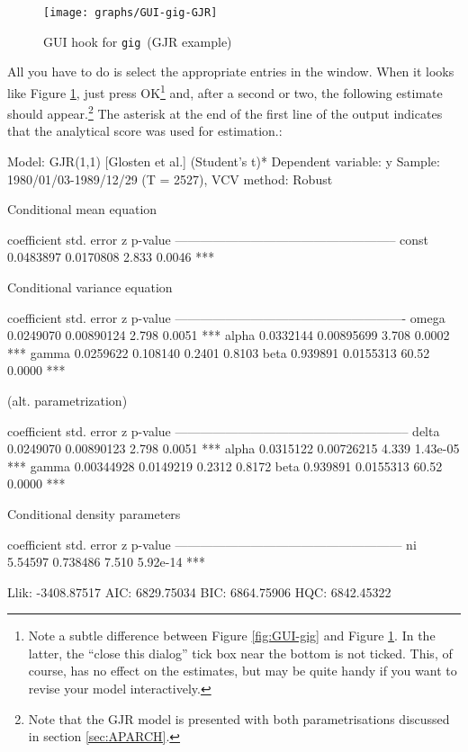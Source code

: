 \documentclass[a4paper,11pt]{article}
\newcommand{\dtk}[1]{\texttt{\detokenize{#1}}}
\newcommand{\gig}{\texttt{gig}}
\begin{document}
\begin{figure}[htb]
  \centering
  \texttt{[image: graphs/GUI-gig-GJR]}
  \caption{GUI hook for \gig\ (GJR example)}
  \label{fig:GUI-gig-GJR}
\end{figure}

All you have to do is select the appropriate entries in the
\dtk{GUI_gig} window. When it looks like Figure
\ref{fig:GUI-gig-GJR}, just press OK\footnote{Note a subtle difference
  between Figure \ref{fig:GUI-gig} and Figure
  \ref{fig:GUI-gig-GJR}. In the latter, the ``close this dialog'' tick
  box near the bottom is not ticked. This, of course, has no effect on
  the estimates, but may be quite handy if you want to revise your
  model interactively.} and, after a second or two, the following
estimate should appear.\footnote{Note that the GJR model is presented
  with both parametrisations discussed in section
  \ref{sec:APARCH}.} The asterisk at the end of the first line of the
output indicates that the analytical score was used for estimation.:

\begin{code}
Model: GJR(1,1) [Glosten et al.] (Student's t)*
Dependent variable: y
Sample: 1980/01/03-1989/12/29 (T = 2527), VCV method: Robust

    Conditional mean equation

             coefficient   std. error     z     p-value
  -----------------------------------------------------
  const       0.0483897    0.0170808    2.833   0.0046  ***

    Conditional variance equation

             coefficient   std. error      z      p-value
  -------------------------------------------------------
  omega       0.0249070    0.00890124    2.798    0.0051  ***
  alpha       0.0332144    0.00895699    3.708    0.0002  ***
  gamma       0.0259622    0.108140      0.2401   0.8103
  beta        0.939891     0.0155313    60.52     0.0000  ***

   (alt. parametrization)

             coefficient   std. error      z      p-value
  --------------------------------------------------------
  delta      0.0249070     0.00890123    2.798    0.0051   ***
  alpha      0.0315122     0.00726215    4.339    1.43e-05 ***
  gamma      0.00344928    0.0149219     0.2312   0.8172
  beta       0.939891      0.0155313    60.52     0.0000   ***

    Conditional density parameters

             coefficient   std. error     z     p-value
  ------------------------------------------------------
  ni           5.54597      0.738486    7.510   5.92e-14 ***

	Llik:  -3408.87517	 AIC:   6829.75034
	BIC:    6864.75906	 HQC:   6842.45322
\end{code}
\end{document}
